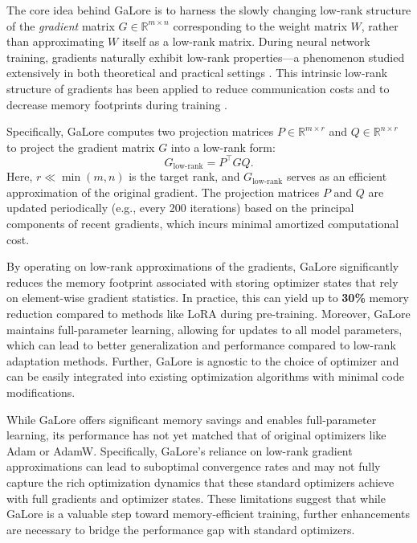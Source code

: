 The core idea behind GaLore is to harness the slowly changing low-rank structure of the \emph{gradient} matrix $G \in \mathbb{R}^{m \times n}$ corresponding to the weight matrix $W$, rather than approximating $W$ itself as a low-rank matrix. During neural network training, gradients naturally exhibit low-rank properties—a phenomenon studied extensively in both theoretical and practical settings \citep{zhaoZerOInitializationInitializing2022,cossonLowRankGradientDescent2023,yang2023spectral}. This intrinsic low-rank structure of gradients has been applied to reduce communication costs \citep{wangATOMOCommunicationefficientLearning,vogelsPowerGossipPracticalLowRank2020} and to decrease memory footprints during training \citep{gooneratneLowrankGradientApproximation2020,huangLowRankGradientDescent2023,modoranuErrorFeedbackCan2024}.

Specifically, GaLore computes two projection matrices $P \in \mathbb{R}^{m \times r}$ and $Q \in \mathbb{R}^{n \times r}$ to project the gradient matrix $G$ into a low-rank form:
\begin{equation}
    G_{\text{low-rank}} = P^\top G Q.
\end{equation}
Here, $r \ll \min(m, n)$ is the target rank, and $G_{\text{low-rank}}$ serves as an efficient approximation of the original gradient. The projection matrices $P$ and $Q$ are updated periodically (e.g., every 200 iterations) based on the principal components of recent gradients, which incurs minimal amortized computational cost.

By operating on low-rank approximations of the gradients, GaLore significantly reduces the memory footprint associated with storing optimizer states that rely on element-wise gradient statistics. In practice, this can yield up to \textbf{30\%} memory reduction compared to methods like LoRA during pre-training. Moreover, GaLore maintains full-parameter learning, allowing for updates to all model parameters, which can lead to better generalization and performance compared to low-rank adaptation methods. Further, GaLore is agnostic to the choice of optimizer and can be easily integrated into existing optimization algorithms with minimal code modifications.

While GaLore offers significant memory savings and enables full-parameter learning, its performance has not yet matched that of original optimizers like Adam or AdamW. Specifically, GaLore's reliance on low-rank gradient approximations can lead to suboptimal convergence rates and may not fully capture the rich optimization dynamics that these standard optimizers achieve with full gradients and optimizer states. These limitations suggest that while GaLore is a valuable step toward memory-efficient training, further enhancements are necessary to bridge the performance gap with standard optimizers.

